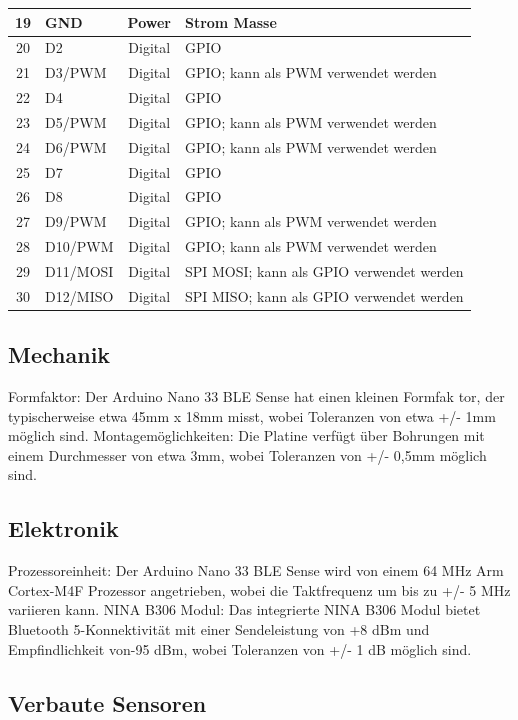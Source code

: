 \begin{longtable}{|c|p{2cm}|c|p{6.5cm}|}
	\hline
	19 & GND & Power & Strom Masse \\
	\hline
	20 & D2 & Digital & GPIO \\
	\hline
	21 & D3/PWM & Digital & GPIO; kann als PWM verwendet werden \\
	\hline
	22 & D4 & Digital & GPIO \\
	\hline
	23 & D5/PWM & Digital & GPIO; kann als PWM verwendet werden \\
	\hline
	24 & D6/PWM & Digital & GPIO; kann als PWM verwendet werden \\
	\hline
	25 & D7 & Digital & GPIO \\
	\hline
	26 & D8 & Digital & GPIO \\
	\hline
	27 & D9/PWM & Digital & GPIO; kann als PWM verwendet werden \\
	\hline
	28 & D10/PWM & Digital & GPIO; kann als PWM verwendet werden \\
	\hline
	29 & D11/MOSI & Digital & SPI MOSI; kann als GPIO verwendet werden \\
	\hline
	30 & D12/MISO & Digital & SPI MISO; kann als GPIO verwendet werden \\
	\hline
	
\end{longtable}

\subsection{Mechanik}
Formfaktor: Der Arduino Nano 33 BLE Sense hat einen kleinen Formfak
tor, der typischerweise etwa 45mm x 18mm misst, wobei Toleranzen von
etwa +/- 1mm möglich sind. Montagemöglichkeiten: Die Platine verfügt
über Bohrungen mit einem Durchmesser von etwa 3mm, wobei Toleranzen
von +/- 0,5mm möglich sind. \cite{Arduino:2021}

\subsection{Elektronik}
Prozessoreinheit: Der Arduino Nano 33 BLE Sense wird von einem 64 MHz
Arm Cortex-M4F Prozessor angetrieben, wobei die Taktfrequenz um bis
zu +/- 5 MHz variieren kann. NINA B306 Modul: Das integrierte NINA
B306 Modul bietet Bluetooth 5-Konnektivität mit einer Sendeleistung
von +8 dBm und Empfindlichkeit von-95 dBm, wobei Toleranzen von
+/- 1 dB möglich sind. \cite{Arduino:2021}

\subsection{Verbaute Sensoren}

